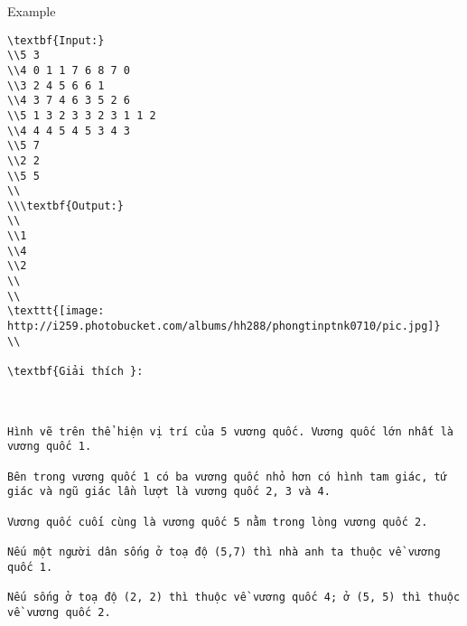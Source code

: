 Example
\begin{verbatim}
\textbf{Input:}
\\5 3
\\4 0 1 1 7 6 8 7 0
\\3 2 4 5 6 6 1
\\4 3 7 4 6 3 5 2 6
\\5 1 3 2 3 3 2 3 1 1 2
\\4 4 4 5 4 5 3 4 3
\\5 7
\\2 2
\\5 5
\\
\\\textbf{Output:}
\\
\\1
\\4
\\2
\\
\\
\texttt{[image: http://i259.photobucket.com/albums/hh288/phongtinptnk0710/pic.jpg]}
\\

\textbf{Giải thích }: 

 

Hình vẽ trên thể hiện vị trí của 5 vương quốc. Vương quốc lớn nhất là vương quốc 1. 

Bên trong vương quốc 1 có ba vương quốc nhỏ hơn có hình tam giác, tứ giác và ngũ giác lần lượt là vương quốc 2, 3 và 4.

Vương quốc cuối cùng là vương quốc 5 nằm trong lòng vương quốc 2. 

Nếu một người dân sống ở toạ độ (5,7) thì nhà anh ta thuộc về vương quốc 1. 

Nếu sống ở toạ độ (2, 2) thì thuộc về vương quốc 4; ở (5, 5) thì thuộc về vương quốc 2.\end{verbatim}